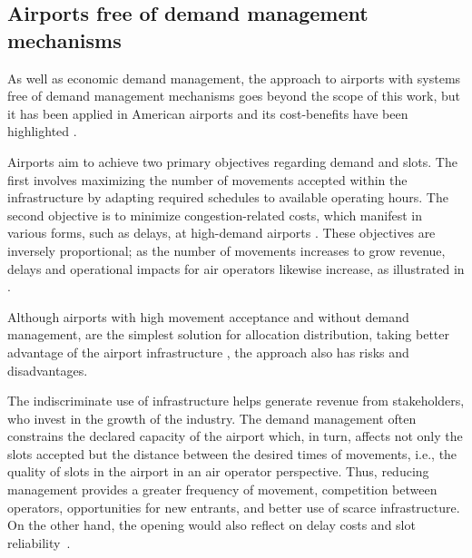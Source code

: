 \subsection{Airports free of demand management mechanisms}
\label{subsec:AirFreDemManMec}



As well as economic demand management, the approach to airports with systems
free of demand management mechanisms goes beyond the scope of this work, but it
has been applied in American airports and its cost-benefits have been
highlighted \cite{cavusoglu2021minimum, gillen2016airport}.


Airports aim to achieve two primary objectives regarding demand and slots. 
The first involves maximizing the number of movements accepted within the 
infrastructure by adapting required schedules to available operating hours. 
The second objective is to minimize congestion-related costs, which manifest 
in various forms, such as delays, at high-demand airports \cite{cavusoglu2021minimum}. 
%
These objectives are inversely proportional; as the number of movements 
increases to grow revenue, delays and operational impacts for air operators 
likewise increase, as illustrated in  
\cite{zografos2017increasing, swaroop2012more, gillen2016airport}.



%



Although airports with high movement acceptance and without demand management,
are the simplest solution for allocation distribution, taking better advantage
of the airport infrastructure \cite{gillen2016airport}, the approach also has
risks and disadvantages.



The indiscriminate use of infrastructure helps generate revenue from
stakeholders, who invest in the growth of the industry.
%
The demand management often constrains the declared capacity of the airport
which, in turn, affects not only the slots accepted but the distance between the
desired times of movements, i.e., the quality of slots in the airport in an air
operator perspective.
%
Thus, reducing management provides a greater frequency of movement, competition
between operators, opportunities for new entrants, and better use of scarce
infrastructure.
%
On the other hand, the opening would also reflect on delay costs and slot
reliability~\cite{zografos2017increasing}.



